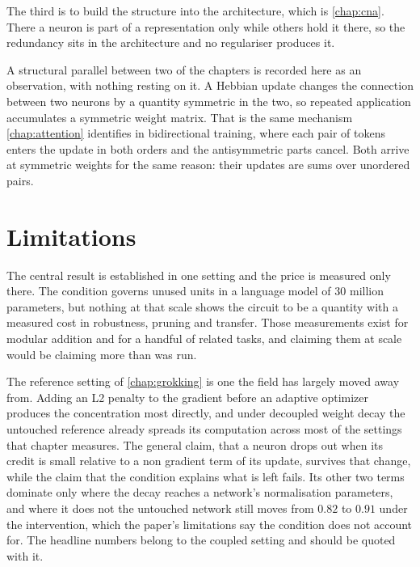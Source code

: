 The third is to build the structure into the architecture, which is
\cref{chap:cna}. There a neuron is part of a representation only while others hold it there,
so the redundancy sits in the architecture and no regulariser produces it.

A structural parallel between two of the chapters is recorded here as an
observation, with nothing resting on it. A Hebbian update changes the connection
between two neurons by a quantity symmetric in the two, so repeated
application accumulates a symmetric weight matrix. That is the same mechanism
\cref{chap:attention} identifies in bidirectional training, where each pair of
tokens enters the update in both orders and the antisymmetric parts cancel.
Both arrive at symmetric weights for the same reason: their updates are sums over
unordered pairs.

\section{Limitations}
\label{sec:disc_limitations}

The central result is established in one setting and the price is measured
only there. The condition governs unused units in a language model of $30$
million parameters, but nothing at that scale shows the circuit to be a
quantity with a measured cost in robustness, pruning and transfer. Those
measurements exist for modular addition and for a handful of related tasks,
and claiming them at scale would be claiming more than was run.

The reference setting of \cref{chap:grokking} is one the field has largely
moved away from. Adding an L2 penalty to the gradient before an adaptive
optimizer produces the concentration most directly, and under decoupled weight
decay the untouched reference already spreads its computation across most of
the settings that chapter measures. The general claim, that a neuron drops out when its credit
is small relative to a non gradient term of its update, survives that change,
while the claim that the condition explains what is left fails. Its other two terms dominate only where the decay reaches a network's
normalisation parameters, and where it does not the untouched network still
moves from $0.82$ to $0.91$ under the intervention, which the paper's
limitations say the condition does not account for. The headline numbers
belong to the coupled setting and should be quoted with it.

